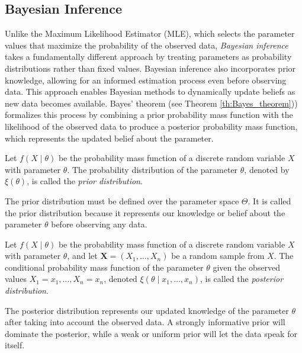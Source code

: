 
\subsection{Bayesian Inference}
\label{sec:bayesian_inference}

Unlike the Maximum Likelihood Estimator (MLE), which selects the parameter values that maximize the probability of the observed data, \emph{Bayesian inference} takes a fundamentally different approach by treating parameters as probability distributions rather than fixed values. Bayesian inference also incorporates prior knowledge, allowing for an informed estimation process even before observing data. This approach enables Bayesian methods to dynamically update beliefs as new data becomes available. Bayes’ theorem (see Theorem \ref{th:Bayes_theorem})) formalizes this process by combining a prior probability mass function with the likelihood of the observed data to produce a posterior probability mass function, which represents the updated belief about the parameter.

\begin{definition}
Let $f\left(X \mid \theta \right)$ be the probability mass function of a discrete random variable $X$ with parameter $\theta$. The probability distribution of the parameter $\theta$, denoted by $\xi\left(\theta\right)$, is called the \emph{prior distribution}.
\end{definition}

The prior distribution must be defined over the parameter space $\Theta$. It is called the prior distribution because it represents our knowledge or belief about the parameter $\theta$ before observing any data.

\begin{definition}
Let $f\left(X \mid \theta \right)$ be the probability mass function of a discrete random variable $X$ with parameter $\theta$, and let $\mathbf{X}=\left(X_{1},\ldots,X_{n}\right)$ be a random sample from $X$. The conditional probability mass function of the parameter $\theta$ given the observed values $X_1 = x_1, \ldots, X_n = x_n$, denoted $\xi \left( \theta \mid x_1, \ldots, x_n \right)$, is called the \emph{posterior distribution}.
\end{definition}

The posterior distribution represents our updated knowledge of the parameter $\theta$ after taking into account the observed data. A strongly informative prior will dominate the posterior, while a weak or uniform prior will let the data speak for itself.

